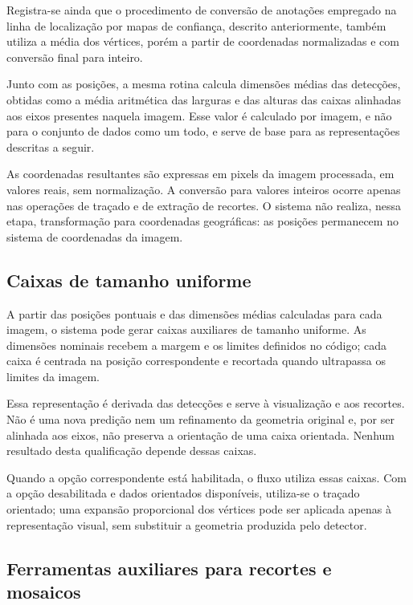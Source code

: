 Registra-se ainda que o procedimento de convers\~ao de anota\c{c}\~oes empregado na linha de localiza\c{c}\~ao por mapas de confian\c{c}a, descrito anteriormente, tamb\'em utiliza a m\'edia dos v\'ertices, por\'em a partir de coordenadas normalizadas e com convers\~ao final para inteiro.

Junto com as posi\c{c}\~oes, a mesma rotina calcula dimens\~oes m\'edias das detec\c{c}\~oes, obtidas como a m\'edia aritm\'etica das larguras e das alturas das caixas alinhadas aos eixos presentes naquela imagem. Esse valor \'e calculado por imagem, e n\~ao para o conjunto de dados como um todo, e serve de base para as representa\c{c}\~oes descritas a seguir.

As coordenadas resultantes s\~ao expressas em pixels da imagem processada, em valores reais, sem normaliza\c{c}\~ao. A convers\~ao para valores inteiros ocorre apenas nas opera\c{c}\~oes de tra\c{c}ado e de extra\c{c}\~ao de recortes. O sistema n\~ao realiza, nessa etapa, transforma\c{c}\~ao para coordenadas geogr\'aficas: as posi\c{c}\~oes permanecem no sistema de coordenadas da imagem.

\subsection{Caixas de tamanho uniforme}
\label{sec:caixas-tamanho-uniforme}

A partir das posi\c{c}\~oes pontuais e das dimens\~oes m\'edias calculadas para cada imagem, o sistema pode gerar caixas auxiliares de tamanho uniforme. As dimens\~oes nominais recebem a margem e os limites definidos no c\'odigo; cada caixa \'e centrada na posi\c{c}\~ao correspondente e recortada quando ultrapassa os limites da imagem.

Essa representa\c{c}\~ao \'e derivada das detec\c{c}\~oes e serve \`a visualiza\c{c}\~ao e aos recortes. N\~ao \'e uma nova predi\c{c}\~ao nem um refinamento da geometria original e, por ser alinhada aos eixos, n\~ao preserva a orienta\c{c}\~ao de uma caixa orientada. Nenhum resultado desta qualifica\c{c}\~ao depende dessas caixas.

Quando a op\c{c}\~ao correspondente est\'a habilitada, o fluxo utiliza essas caixas. Com a op\c{c}\~ao desabilitada e dados orientados dispon\'iveis, utiliza-se o tra\c{c}ado orientado; uma expans\~ao proporcional dos v\'ertices pode ser aplicada apenas \`a representa\c{c}\~ao visual, sem substituir a geometria produzida pelo detector.

\subsection{Ferramentas auxiliares para recortes e mosaicos}
\label{sec:ferramentas-auxiliares-recortes}

